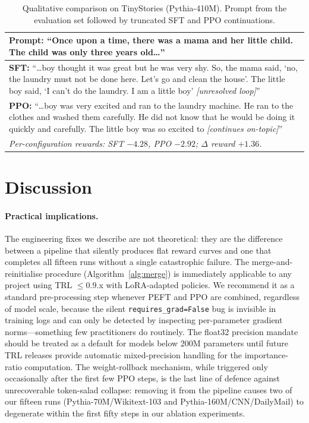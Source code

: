 \documentclass[10pt,twocolumn,letterpaper]{article}
\begin{document}
\begin{table}[h]
\centering
\caption{Qualitative comparison on TinyStories (Pythia-410M). Prompt from the evaluation set followed by truncated SFT and PPO continuations.}
\label{tab:qual}
\small
\begin{tabular}{p{}}
\toprule
\textbf{Prompt:} ``Once upon a time, there was a mama and her little child. The child was only three years old\ldots'' \\
\midrule
\textbf{SFT:} ``\ldots boy thought it was great but he was very shy. So, the mama said, `no, the laundry must not be done here. Let's go and clean the house'. The little boy said, `I can't do the laundry. I am a little boy' \textit{[unresolved loop]}'' \\[3pt]
\textbf{PPO:} ``\ldots boy was very excited and ran to the laundry machine. He ran to the clothes and washed them carefully. He did not know that he would be doing it quickly and carefully. The little boy was so excited to \textit{[continues on-topic]}'' \\
\midrule
\multicolumn{1}{l}{\textit{Per-configuration rewards: SFT $-4.28$, PPO $-2.92$; $\Delta$ reward $+1.36$.}} \\
\bottomrule
\end{tabular}
\end{table}

\section{Discussion}
\label{sec:discussion}

\paragraph{Practical implications.}
The engineering fixes we describe are not theoretical: they are the difference between a pipeline that silently produces flat reward curves and one that completes all fifteen runs without a single catastrophic failure. The merge-and-reinitialise procedure (Algorithm~\ref{alg:merge}) is immediately applicable to any project using TRL $\le$0.9.x with LoRA-adapted policies. We recommend it as a standard pre-processing step whenever PEFT and PPO are combined, regardless of model scale, because the silent \texttt{requires\_grad=False} bug is invisible in training logs and can only be detected by inspecting per-parameter gradient norms---something few practitioners do routinely. The float32 precision mandate should be treated as a default for models below 200M parameters until future TRL releases provide automatic mixed-precision handling for the importance-ratio computation. The weight-rollback mechanism, while triggered only occasionally after the first few PPO steps, is the last line of defence against unrecoverable token-salad collapse: removing it from the pipeline causes two of our fifteen runs (Pythia-70M/Wikitext-103 and Pythia-160M/CNN/DailyMail) to degenerate within the first fifty steps in our ablation experiments.
\end{document}
